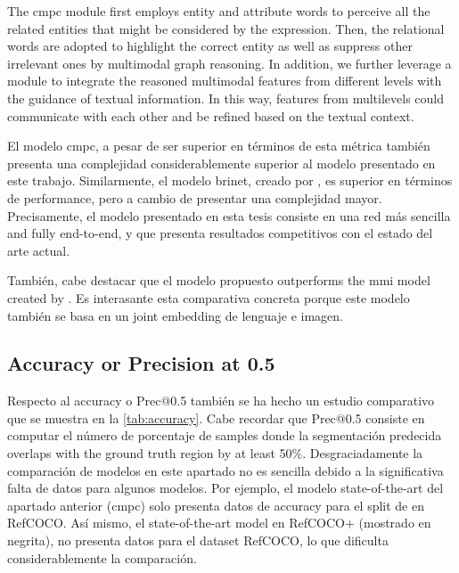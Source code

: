 \begin{quoteBox}
  The \gls{cmpc} module first employs entity and attribute words to perceive
  all the related entities that might be considered by the expression. Then,
  the relational words are adopted to highlight the correct entity as well as
  suppress other irrelevant ones by multimodal graph reasoning. In addition, we
  further leverage a module to integrate the reasoned multimodal features from
  different levels with the guidance of textual information. In this way,
  features from multilevels could communicate with each other and be refined
  based on the textual context.
  \tcblower{}
\end{quoteBox}

El modelo \gls{cmpc}, a pesar de ser superior en términos de esta métrica
también presenta una complejidad considerablemente superior al modelo
presentado en este trabajo. Similarmente, el modelo \gls{brinet}, creado por
, es superior en términos de
performance, pero a cambio de presentar una complejidad mayor. Precisamente, el
modelo presentado en esta tesis consiste en una red más sencilla and fully
end-to-end, y que presenta resultados competitivos con el estado del arte
actual.

También, cabe destacar que el modelo propuesto outperforms the \gls{mmi} model
created by . Es interasante esta comparativa concreta
porque este modelo también se basa en un joint embedding de lenguaje e imagen.


\subsection{Accuracy or Precision at 0.5}\label{sec:accuracy}

Respecto al accuracy o Prec@0.5 también se ha hecho un estudio comparativo que
se muestra en la \vref{tab:accuracy}. Cabe recordar que Prec@0.5 consiste en
computar el número de porcentaje de samples donde la segmentación predecida
overlaps with the ground truth region by at least 50\%. Desgraciadamente la
comparación de modelos en este apartado no es sencilla debido a la
significativa falta de datos para algunos modelos. Por ejemplo, el modelo
state-of-the-art del apartado anterior (\gls{cmpc}) solo presenta datos de
accuracy para el split de  en RefCOCO. Así mismo, el state-of-the-art
model en RefCOCO+ (mostrado en negrita), no presenta datos para el dataset
RefCOCO, lo que dificulta considerablemente la comparación.

